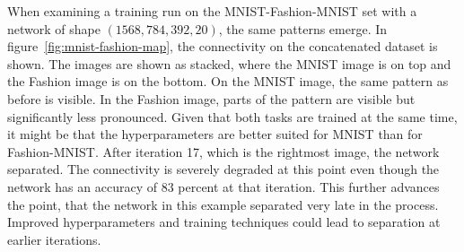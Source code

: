 When examining a training run on the MNIST-Fashion-MNIST set with a network of shape $(1568, 784, 392, 20)$, the same patterns emerge.
In figure~\ref{fig:mnist-fashion-map}, the connectivity on the concatenated dataset is shown.
The images are shown as stacked, where the MNIST image is on top and the Fashion image is on the bottom.
On the MNIST image, the same pattern as before is visible.
In the Fashion image, parts of the pattern are visible but significantly less pronounced.
Given that both tasks are trained at the same time, it might be that the hyperparameters are better suited for MNIST than for Fashion-{MNIST}.
After iteration 17, which is the rightmost image, the network separated.
The connectivity is severely degraded at this point even though the network has an accuracy of $83$ percent at that iteration.
This further advances the point, that the network in this example separated very late in the process.
Improved hyperparameters and training techniques could lead to separation at earlier iterations.